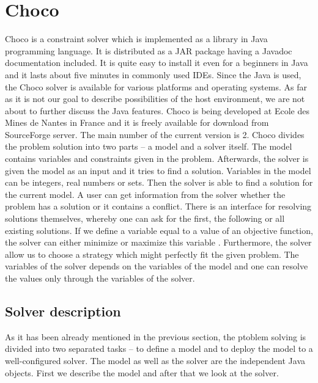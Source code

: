 \section{Choco}

Choco is a constraint solver which is implemented as a library in Java programming language.
It is distributed as a JAR package having a Javadoc documentation included. It is quite easy
to install it even for a beginners in Java and it lasts about five minutes in commonly used
IDEs. Since the Java is used, the Choco solver is available for various platforms
and operating systems. As far as it is not our goal to describe possibilities of the host environment, 
we are not about to further discuss the Java features. Choco is being developed
at Ecole des Mines de Nantes in France and it is freely available for download from 
SourceForge server. The main number of the current version is 2. Choco divides the problem solution
into two parts -- a model and a solver itself. The model contains variables and constraints given 
in the problem. Afterwards, the solver is given the model as an input and it tries to find a solution. 
Variables in the model can be integers, real numbers or sets. Then the solver is able to
find a solution for the current model. A user can get information from the solver whether the 
problem has a solution or it contains a conflict. There is an interface for resolving solutions themselves, 
whereby one can ask for the first, the following or all existing solutions. If we define a variable
equal to a value of an objective function, the solver can either minimize or maximize this variable .
Furthermore, the solver allow us to choose a strategy which might perfectly fit the given problem.
The variables of the solver depends on the variables of the model and one can resolve the values only through
the variables of the solver.

\subsection{Solver description}
As it has been already mentioned in the previous section, the ptoblem solving is divided
into two separated tasks -- to define a model and to deploy the model to a well-configured solver.
The model as well as the solver are the independent Java objects. First we describe the 
model and after that we look at the solver. 

